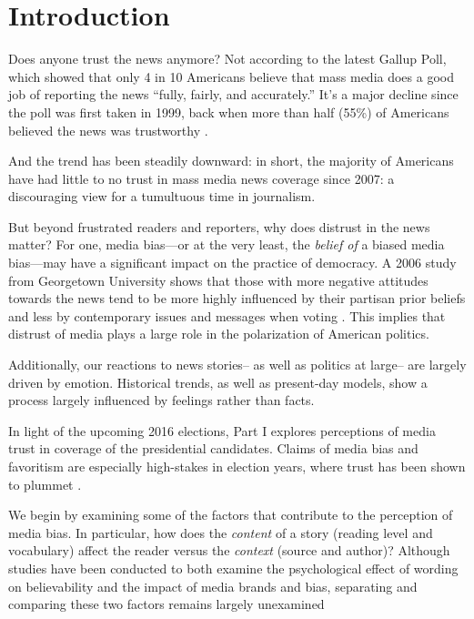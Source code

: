 
\chapter{Introduction} 

Does anyone trust the news anymore? Not according to the latest Gallup Poll, which showed that only 4 in 10 Americans believe that mass media does a good job of reporting the news ``fully, fairly, and accurately.'' It's a major decline since the poll was first taken in 1999, back when more than half (55\%) of Americans believed the news was trustworthy \cite{Gallup-trust-2015}.

And the trend has been steadily downward: in short, the majority of Americans have had little to no trust in mass media news coverage since 2007: a discouraging view for a tumultuous time in journalism.

But beyond frustrated readers and reporters, why does distrust in the news matter? For one, media bias---or at the very least, the \emph{belief of} a biased media bias---may have a significant impact on the practice of democracy. A 2006 study from Georgetown University shows that those with more negative attitudes towards the news tend to be more highly influenced by their partisan prior beliefs and less by contemporary issues and messages when voting \cite{ladd2005attitudes}. This implies that distrust of media plays a large role in the polarization of American politics.

Additionally, our reactions to news stories-- as well as politics at large-- are largely driven by emotion. Historical trends, as well as present-day models, show a process largely influenced by feelings rather than facts.


In light of the upcoming 2016 elections, Part I explores perceptions of media trust in coverage of the presidential candidates. Claims of media bias and favoritism are especially high-stakes in election years, where trust has been shown to plummet \cite{Gallup-trust-2015}.  

We begin by examining some of the factors that contribute to the perception of media bias. In particular, how does the \emph{content} of a story (reading level and vocabulary) affect the reader versus the \emph{context} (source and author)? Although studies have been conducted to both examine the psychological effect of wording on believability and the impact of media brands and bias, separating and comparing these two factors remains largely unexamined \cite{weisberg2008seductive, baum2008eye}

